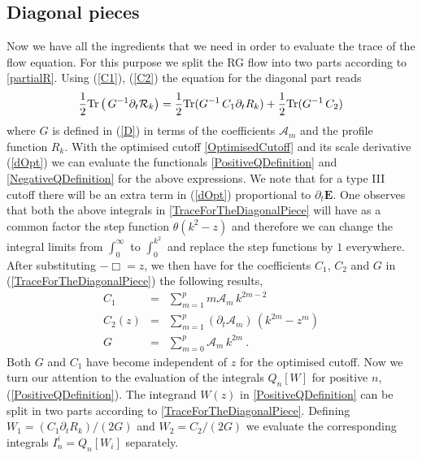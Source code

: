 \documentclass[notitlepage,eqsecnum,bm,amsmath,preprintnumbers,superscriptaddress,nofootinbib,aps,11pt]{revtex4-1}
\def\eq#1{(\ref{#1})}
\begin{document}
\subsection{Diagonal pieces} 
\label{subsec:FRGDiagonal}
Now we have all the ingredients that we need in order to evaluate the trace of the flow equation. For this purpose we split the RG flow into two parts according to \eqref{partialR}. Using \eq{C1}, \eq{C2} the equation for the diagonal part reads
\begin{equation}
\frac{1}{2}\textnormal{Tr}\left(
\,G^{-1}\partial_t\mathcal{R}_k\right)
=\frac{1}{2}\textnormal{Tr}(G^{-1}\,C_1\partial_tR_k)+\frac{1}{2}\textnormal{Tr}(G^{-1}\,C_2)\label{TraceForTheDiagonalPiece}
\end{equation}
where $G$ is defined in \eq{D} in terms of the coefficients $\mathcal{A}_m$ and the profile function $R_k$.
With the optimised cutoff \eqref{OptimisedCutoff} and its
scale derivative \eq{dOpt}
we can evaluate the functionals \eqref{PositiveQDefinition} and \eqref{NegativeQDefinition} for the above expressions. We note that for a type III cutoff there will be an extra term in \eq{dOpt} proportional to $\partial_t \mathbf{E}$.
One observes that both the above integrals in \eqref{TraceForTheDiagonalPiece} will have as a common factor 
the step function $\theta(k^2-z)$ and therefore we can change the integral limits from $\int_0^{\infty}$ to $\int_0^{k^2}$ 
and replace the step functions by $1$ everywhere.  
After substituting $-\Box=z$, we then have for the coefficients $C_1$, $C_2$ and $ G$ in \eq{TraceForTheDiagonalPiece} the following results,
\begin{equation}\label{c1c2G_opt}
\begin{array}{rcl}
C_1&=&
\displaystyle
\sum_{m=1}^{p} m\mathcal{A}_m \,k^{2m-2} \\[1ex]
C_2(z)&=&
\displaystyle
\sum_{m=1}^{p} (\partial_t\mathcal{A}_m) \,(k^{2m}-z^m) \\[1ex]
G&=&
\displaystyle
\sum_{m=0}^{p} \mathcal{A}_m \,k^{2m}\ .
\end{array}
\end{equation}
Both $G$ and $C_1$ have become independent of $z$ for the optimised cutoff. Now we turn our attention to the evaluation of the integrals $Q_n[W]$ for positive $n$, \eq{PositiveQDefinition}. 
The integrand $W(z)$  in \eqref{PositiveQDefinition}  can be split in two parts according to \eqref{TraceForTheDiagonalPiece}. Defining 
$W_1=(C_1\partial_tR_k)/(2G)$ and $W_2=C_2/(2G)$
we evaluate the corresponding integrals $I_n^i=Q_n[W_i]$ separately. 
\end{document}
